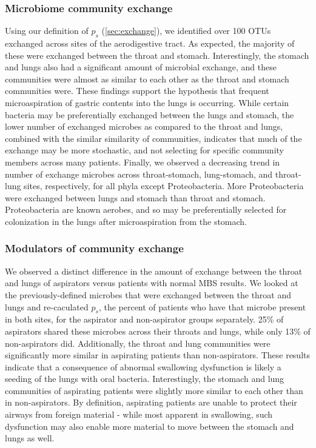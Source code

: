 \documentclass[12pt]{article}
\begin{document}
\subsubsection{Microbiome community exchange}
Using our definition of $p_s$ (\ref{sec:exchange}), we identified over 100
OTUs exchanged across sites of the aerodigestive tract.
As expected, the majority of these were exchanged between the throat and stomach.
Interestingly, the stomach and lungs also had a significant
amount of microbial exchange, and these communities were almost as similar to
each other as the throat and stomach communities were. 
These findings support the hypothesis that frequent microaspiration
of gastric contents into the lungs is occurring. While certain bacteria
may be preferentially exchanged between the lungs and stomach, the lower 
number of exchanged microbes as compared to the throat and lungs, combined with
the similar similarity of communities, indicates that much of the exchange may
be more stochastic, and not selecting for specific community members
across many patients.
Finally, we observed a decreasing trend in number of exchange microbes 
across throat-stomach, lung-stomach, and throat-lung sites, respectively, 
for all phyla except Proteobacteria. More Proteobacteria were exchanged 
between lungs and stomach than throat and stomach. Proteobacteria are 
known aerobes, and so may be preferentially selected for colonization in 
the lungs after microaspiration from the stomach.

\subsubsection{Modulators of community exchange}
We observed a distinct difference in the amount of exchange between the 
throat and lungs of aspirators versus patients with normal MBS results.
We looked at the previously-defined microbes that were exchanged between 
the throat and lungs and re-caculated $p_s$, the percent of patients
who have that microbe present in both sites, for the aspirator and 
non-aspirator groups separately. 25\% of aspirators shared
these microbes across their throats and lungs, while only 13\% of 
non-aspirators did. Additionally, the throat and lung communities
were significantly more similar in aspirating patients than non-aspirators. These results indicate that a consequence of abnormal swallowing
dysfunction is likely a seeding of the lungs with oral bacteria.
Interestingly, the stomach and lung communities of aspirating
patients were slightly more similar to each other than in non-aspirators.
By definition, aspirating patients are unable to protect their airways
from foreign material - while most apparent in swallowing, such dysfunction
may also enable more material to move between the stomach and lungs as well.
\end{document}

